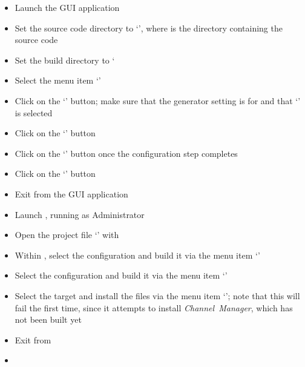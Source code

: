 \begin{itemize}
\item Launch the  GUI application
\item\exSp{} Set the source code directory to `',
where  is the directory containing the \mplusm{} source code
\item\exSp{} Set the build directory to `
\item\exSp{} Select the menu item `'
\item\exSp{} Click on the `' button; make sure that the generator
setting is for  and that `' is
selected
\item\exSp{} Click on the `' button
\item\exSp{} Click on the `' button once the configuration step
completes
\item\exSp{} Click on the `' button
\item\exSp{} Exit from the  GUI application
\item\exSp{} Launch , running as Administrator
\item\exSp{} Open the project file
`' with
\item\exSp{} Within , select the  configuration and
build it via the menu item `'
\item\exSp{} Select the  configuration and build it via the menu item
`'
\item\exSp{} Select the  target and install the  files via
the menu item `'; note that this will fail the first time, since it attempts to install
\textit{Channel~Manager}, which has not been built yet
\item\exSp{} Exit from 
\end{itemize}
\tertiaryEnd
{}
\begin{itemize}
\item\TBD
\end{itemize}

